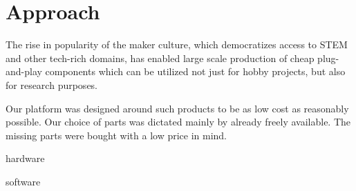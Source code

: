 \documentclass[class=report, crop=false]{standalone}
\begin{document}
\chapter{Approach}\label{cha:approach}
\pagestyle{scrheadings}
The rise in popularity of the maker culture, which democratizes access to STEM and other tech-rich domains, has enabled large scale production of cheap plug-and-play components which can be utilized not just for hobby projects, but also for research purposes.

Our platform was designed around such products to be as low cost as reasonably possible. Our choice of parts was dictated mainly by already freely available. The missing parts were bought with a low price in mind.

{hardware}

{software}
\end{document}
